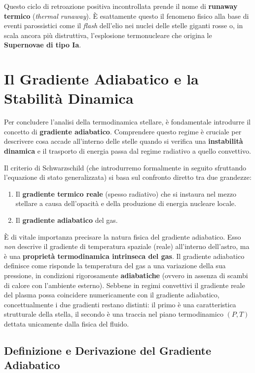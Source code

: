 Questo ciclo di retroazione positiva incontrollata prende il nome di \textbf{runaway termico} (\textit{thermal runaway}). È esattamente questo il fenomeno fisico alla base di eventi parossistici come il \textit{flash} dell'elio nei nuclei delle stelle giganti rosse o, in scala ancora più distruttiva, l'esplosione termonucleare che origina le \textbf{Supernovae di tipo Ia}.

\section{Il Gradiente Adiabatico e la Stabilità Dinamica}

Per concludere l'analisi della termodinamica stellare, è fondamentale introdurre il concetto di \textbf{gradiente adiabatico}. Comprendere questo regime è cruciale per descrivere cosa accade all'interno delle stelle quando si verifica una \textbf{instabilità dinamica} e il trasporto di energia passa dal regime radiativo a quello convettivo.

Il criterio di Schwarzschild (che introdurremo formalmente in seguito sfruttando l'equazione di stato generalizzata) si basa sul confronto diretto tra due grandezze:
\begin{enumerate}
\item Il \textbf{gradiente termico reale} (spesso radiativo) che si instaura nel mezzo stellare a causa dell'opacità e della produzione di energia nucleare locale.
\item Il \textbf{gradiente adiabatico} del gas.
\end{enumerate}

È di vitale importanza precisare la natura fisica del gradiente adiabatico. Esso \textit{non} descrive il gradiente di temperatura spaziale (reale) all'interno dell'astro, ma è una \textbf{proprietà termodinamica intrinseca del gas}. Il gradiente adiabatico definisce come risponde la temperatura del gas a una variazione della sua pressione, in condizioni rigorosamente \textbf{adiabatiche} (ovvero in assenza di scambi di calore con l'ambiente esterno). Sebbene in regimi convettivi il gradiente reale del plasma possa coincidere numericamente con il gradiente adiabatico, concettualmente i due gradienti restano distinti: il primo è una caratteristica strutturale della stella, il secondo è una traccia nel piano termodinamico $(P, T)$ dettata unicamente dalla fisica del fluido.

\subsection{Definizione e Derivazione del Gradiente Adiabatico}

